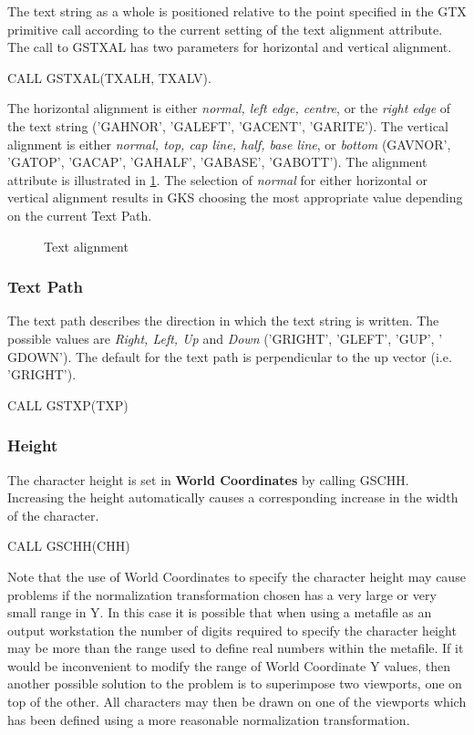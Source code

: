 The text string as a whole is positioned relative to the point specified
in the GTX primitive call according to the current setting of the text
alignment attribute. The call to GSTXAL has two parameters for
horizontal and vertical alignment.
\begin{XMP}
CALL GSTXAL(TXALH, TXALV).
\end{XMP}
The horizontal alignment is either {\it normal, left edge, centre},
or the {\it right edge} of the text string
('GAHNOR', 'GALEFT', 'GACENT', 'GARITE').
The vertical alignment is either {\it normal, top, cap line, half,
base line}, or {\it bottom}
(GAVNOR', 'GATOP', 'GACAP', 'GAHALF', 'GABASE', 'GABOTT').
The alignment attribute is illustrated in \ref{fig:align}.
The selection of {\it normal} for either horizontal or vertical
alignment results in GKS choosing the most appropriate value
depending on the current Text Path.
\begin{figure}[h]
\caption{Text alignment}
\label{fig:align}
\end{figure}
\subsubsection{Text Path}
 
The text path describes the direction in which the text string is written.
The possible values are {\it Right, Left, Up} and {\it Down}
('GRIGHT', 'GLEFT', 'GUP', ' GDOWN').
The default for the text path is perpendicular to the up vector (i.e. 'GRIGHT').
\begin{XMP}
CALL GSTXP(TXP)
\end{XMP}
\subsubsection{Height}
 
The character height is set in {\bf World Coordinates} by calling
GSCHH. Increasing the height automatically causes a corresponding
increase in the width of the character.
\begin{XMP}
CALL GSCHH(CHH)
\end{XMP}
 
Note that the use of World Coordinates to specify the character height may
cause problems if the normalization transformation chosen has a very large
or very small range in Y. In this case it is possible that when using a
metafile as an output workstation the number of digits required to
specify the character height may be more than the range used to define
real numbers within the metafile. If it would be inconvenient to modify
the range of World Coordinate Y values, then another possible solution to
the problem is to superimpose two viewports, one on top of the other.
All characters may then be drawn on one of the viewports which has been
defined using a more reasonable normalization transformation.
